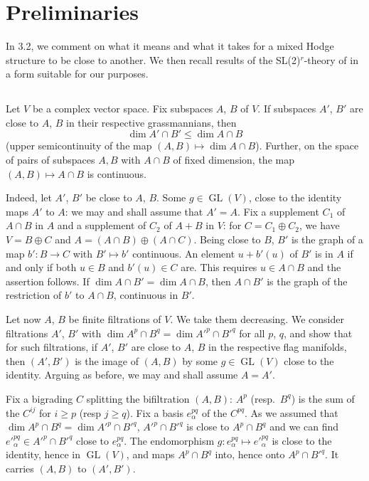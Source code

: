 \documentclass[11pt,a4paper]{article}
\theoremstyle{plain}
\theoremstyle{definition}
\DeclareMathOperator{\GL}{GL}
\begin{document}
\section{Preliminaries}

In 3.2, we comment on what it means and what it takes for a mixed Hodge structure to be close to another. We then recall results of the SL(2)$^r$-theory of \cite{cks} in a form suitable for our purposes.

\subsection{}
Let $V$ be a complex vector space. Fix subspaces $A$, $B$ of $V$. If subspaces $A'$, $B'$ are close to $A$, $B$ in their respective grassmannians, then
\begin{equation}\label{eq:semicontinuous}
\dim A'\cap B'\leq\dim A\cap B
\end{equation}
(upper semicontinuity of the map $(A,B)\mapsto\dim A\cap B$). Further, on the space of pairs of subspaces $A,B$ with $A\cap B$ of fixed dimension, the map $(A,B)\mapsto A\cap B$ is continuous.

Indeed, let $A'$, $B'$ be close to $A$, $B$. Some $g\in\GL(V)$, close to the identity maps $A'$ to $A$: we may and shall assume that $A'=A$. Fix a supplement $C_1$ of $A\cap B$ in $A$ and a supplement of $C_2$ of $A+B$ in $V$: for $C=C_1\oplus C_2$, we have $V=B\oplus C$ and $A=(A\cap B)\oplus(A\cap C)$. Being close to $B$, $B'$ is the graph of a map $b':B\to C$ with $B'\mapsto b'$ continuous. An element $u+b'(u)$ of $B'$ is in $A$ if and only if both $u\in B$ and $b'(u)\in C$ are. This requires $u\in A\cap B$ and the assertion follows. If $\dim A\cap B'=\dim A\cap B$, then $A\cap B'$ is the graph of the restriction of $b'$ to $A\cap B$, continuous in $B'$.

Let now $A$, $B$ be finite filtrations of $V$. We take them decreasing. We consider filtrations $A'$, $B'$ with $\dim A^p\cap B^q=\dim A'^p\cap B'^q$ for all $p$, $q$, and show that for such filtrations, if $A'$, $B'$ are close to $A$, $B$ in the respective flag manifolds, then $(A',B')$ is the image of $(A,B)$ by some $g\in\GL(V)$ close to the identity. Arguing as before, we may and shall assume $A=A'$.

Fix a bigrading $C$ splitting the bifiltration $(A,B)$: $A^p$ (resp.\ $B^q$) is the sum of the $C^{ij}$ for $i\geq p$ (resp $j\geq q$). Fix a basis $e_{\alpha}^{pq}$ of the $C^{pq}$. As we assumed that $\dim A^p\cap B^q=\dim A'^p\cap B'^q$, $A'^p\cap B'^q$ is close to $A^p\cap B^q$ and we can find $e'^{pq}_{\alpha}\in A'^p\cap B'^q$ close to $e^{pq}_{\alpha}$. The endomorphism $g:e^{pq}_{\alpha}\mapsto e'^{pq}_{\alpha}$ is close to the identity, hence in $\GL(V)$, and maps $A^p\cap B^q$ into, hence onto $A^p\cap B'^q$. It carries $(A,B)$ to $(A',B')$.
\end{document}
